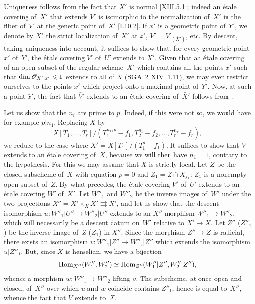 Uniqueness follows from the fact that $X'$ is normal
\eqref{XIII.5.1}; indeed
an \'etale covering of~$X'$ that extends $V'$ is isomorphic to the
normalization of~$X'$ in the fiber of~$V'$ at the generic point
of~$X'$ \eqref{I.10.2}. If $\bar{x}'$ is a geometric point
of~$Y'$, we denote by $\bar{X}'$ the strict localization of~$X'$ at
$\bar{x}'$, $\bar{V}'=V'_{(\bar{X}')}$, etc. By descent, taking
uniqueness into account, it suffices to show that, for every
geometric point $\bar{x}'$ of~$Y'$, the \'etale covering
$\bar{V}'$ of~$\bar{U}'$ extends to $\bar{X}'$. Given
that an \'etale covering of an open subset of the regular scheme~$X'$
which contains all the points $x'$ such that $\dim
\cal{O}_{X',x'}\leq 1$ extends to all of $X$
(SGA~2 XIV~1.11), we may even restrict ourselves to the points $\bar{x}'$ which
project onto a maximal point of~$Y'$. Now, at such a point
$\bar{x}'$, the fact that $\bar{V}'$ extends to an \'etale
covering of~$\bar{X}'$ follows from~.

Let us show that the $n_i$ are prime to $p$. Indeed, if this
were not so, we would have for example $p|n_1$. Replacing
$X$ by
$$X[T_1,\dots,T_r]/(T_1^{n_1/p}-f_1,T_2^{n_2}-f_2,\dots,T_r^{n_r}-f_r),$$
we reduce to the case where $X'=X[T_1]/(T_1^p-f_1)$. It suffices
to show that $V$ extends to an \'etale covering of~$X$,
because we will then have $n_1=1$, contrary to the hypothesis. For this we may
assume that $X$ is strictly local. Let $Z$ be the
closed subscheme of~$X$ with equation $p=0$ and $Z_1=Z\cap
X_{f_1}$; $Z_1$ is a nonempty open subset of~$Z$. By what
precedes, the \'etale covering $V'$ of~$U'$ extends
to an \'etale covering $W'$ of~$X'$. Let $W''_1$ and $W''_2$
be the inverse images of~$W'$ under the two projections $X''=X'\times_X
X'\rightrightarrows X'$, and let us show that the descent isomorphism
$u\colon W''_1|U''\to W''_2|U''$ extends to an $X''$-morphism
$W''_1\to W''_2$, which will necessarily be a descent
datum on~$W'$ relative to $X'\to X$. Let $Z''$
(\resp $Z''_1$) be the inverse image of~$Z$ (\resp $Z_1$) in $X''$. Since
the morphism $Z''\to Z$ is radicial, there exists an isomorphism
$v\colon W''_1|Z''\to W''_2|Z''$ which extends the isomorphism
$u|Z''_1$. But, since $X$ is henselian, we have a bijection
$$
\operatorname{Hom}_{X''}(W''_1,W''_2)\simeq\operatorname{Hom}_{Z''}(W''_1|Z'',W_2''|Z''),
$$
whence a morphism $w\colon W''_1\to W''_2$ lifting $v$. The
subscheme, at once open
and closed, of~$X''$ over which $u$ and $w$ coincide
contains $Z''_1$, hence is equal to~$X''$, whence the fact that $V$
extends to~$X$.


